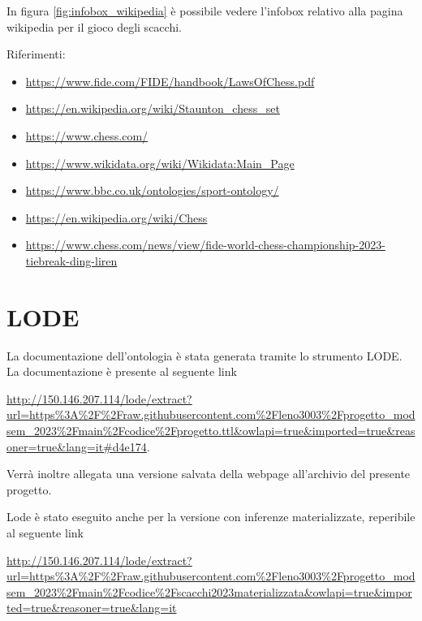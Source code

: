 \documentclass[12pt]{book}
\begin{document}
In figura \ref{fig:infobox_wikipedia} è possibile vedere l'infobox
relativo alla pagina wikipedia per il gioco degli scacchi.

Riferimenti:
\begin{itemize}

  \item \url{https://www.fide.com/FIDE/handbook/LawsOfChess.pdf}
  \item \url{https://en.wikipedia.org/wiki/Staunton_chess_set}
  \item \url{https://www.chess.com/}
  \item \url{https://www.wikidata.org/wiki/Wikidata:Main_Page}
  \item \url{https://www.bbc.co.uk/ontologies/sport-ontology/}
  \item \url{https://en.wikipedia.org/wiki/Chess}
  \item \url{https://www.chess.com/news/view/fide-world-chess-championship-2023-tiebreak-ding-liren}

\end{itemize}


\chapter{LODE}

La documentazione dell'ontologia è stata generata tramite lo strumento
LODE. La documentazione è presente al seguente link 

\begin{tcolorbox}[]

\url{http://150.146.207.114/lode/extract?url=https%3A%2F%2Fraw.githubusercontent.com%2Fleno3003%2Fprogetto_modsem_2023%2Fmain%2Fcodice%2Fprogetto.ttl&owlapi=true&imported=true&reasoner=true&lang=it#d4e174}.

\end{tcolorbox}

Verrà inoltre allegata una versione salvata della webpage
all'archivio del presente progetto.

Lode è stato eseguito anche per la versione con inferenze
materializzate, reperibile al seguente link

\begin{tcolorbox}[title=]
  \url{http://150.146.207.114/lode/extract?url=https%3A%2F%2Fraw.githubusercontent.com%2Fleno3003%2Fprogetto_modsem_2023%2Fmain%2Fcodice%2Fscacchi2023materializzata&owlapi=true&imported=true&reasoner=true&lang=it} 
\end{tcolorbox}
\end{document}
